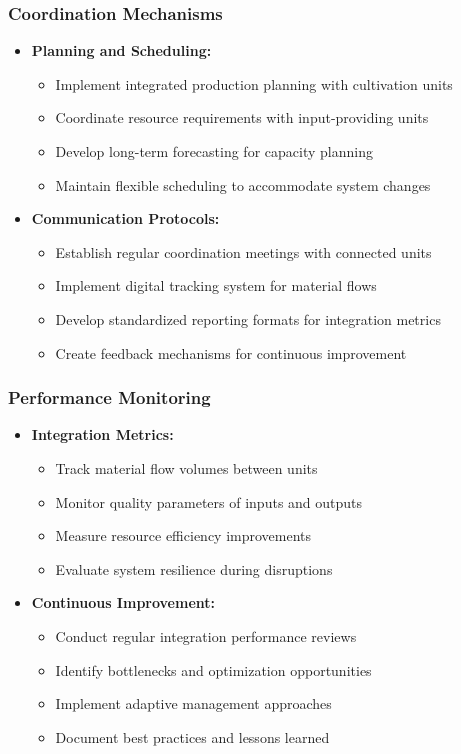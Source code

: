 \subsubsection{Coordination Mechanisms}
\begin{itemize}
    \item \textbf{Planning and Scheduling:}
    \begin{itemize}
        \item Implement integrated production planning with cultivation units
        \item Coordinate resource requirements with input-providing units
        \item Develop long-term forecasting for capacity planning
        \item Maintain flexible scheduling to accommodate system changes
    \end{itemize}
    
    \item \textbf{Communication Protocols:}
    \begin{itemize}
        \item Establish regular coordination meetings with connected units
        \item Implement digital tracking system for material flows
        \item Develop standardized reporting formats for integration metrics
        \item Create feedback mechanisms for continuous improvement
    \end{itemize}
\end{itemize}

\subsubsection{Performance Monitoring}
\begin{itemize}
    \item \textbf{Integration Metrics:}
    \begin{itemize}
        \item Track material flow volumes between units
        \item Monitor quality parameters of inputs and outputs
        \item Measure resource efficiency improvements
        \item Evaluate system resilience during disruptions
    \end{itemize}
    
    \item \textbf{Continuous Improvement:}
    \begin{itemize}
        \item Conduct regular integration performance reviews
        \item Identify bottlenecks and optimization opportunities
        \item Implement adaptive management approaches
        \item Document best practices and lessons learned
    \end{itemize}
\end{itemize}


